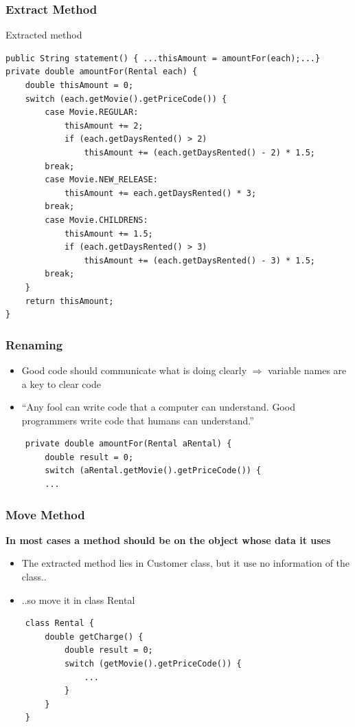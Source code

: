 \documentclass{beamer}
\begin{document}
\begin{frame}[containsverbatim]
	\frametitle{Extract Method}
	Extracted method \\
	\begin{lstlisting}
public String statement() { ...thisAmount = amountFor(each);...}
private double amountFor(Rental each) {
	double thisAmount = 0;
	switch (each.getMovie().getPriceCode()) {
		case Movie.REGULAR:
			thisAmount += 2;
			if (each.getDaysRented() > 2)
				thisAmount += (each.getDaysRented() - 2) * 1.5;
		break;
		case Movie.NEW_RELEASE:
			thisAmount += each.getDaysRented() * 3;
		break;
		case Movie.CHILDRENS:
			thisAmount += 1.5;
			if (each.getDaysRented() > 3)
				thisAmount += (each.getDaysRented() - 3) * 1.5;
		break;
	}
	return thisAmount;
}
\end{lstlisting}
\end{frame}

\begin{frame}[containsverbatim]
  \frametitle{Renaming}
   \begin{itemize}
     \item Good code should communicate what is doing clearly $\Rightarrow$ variable names are a key to clear code
   \item  ``Any fool can write code that a computer can understand. Good programmers write
code that humans can understand.''
	\end{itemize}
	\begin{lstlisting}
	private double amountFor(Rental aRental) {
		double result = 0;
		switch (aRental.getMovie().getPriceCode()) {
		...
	\end{lstlisting}
\end{frame}

\begin{frame}[containsverbatim]
  \frametitle{Move Method}
  \textbf{In most cases a method should be on the object whose data it uses}
   \begin{itemize}
  		\item The extracted method lies in Customer class, but it use no information of the class..
		\item ..so move it in class Rental
  \end{itemize}
  \begin{lstlisting}
	class Rental {
		double getCharge() {
			double result = 0;
			switch (getMovie().getPriceCode()) {
				...
			}
		}
	}
	\end{lstlisting}
\end{frame}
\end{document}
